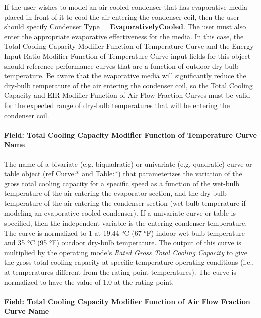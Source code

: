If the user wishes to model an air-cooled condenser that has evaporative media placed in front of it to cool the air entering the condenser coil, then the user should specify Condenser Type = \textbf{EvaporativelyCooled}. The user must also enter the appropriate evaporative effectiveness for the media. In this case, the Total Cooling Capacity Modifier Function of Temperature Curve and the Energy Input Ratio Modifier Function of Temperature Curve input fields for this object should reference performance curves that are a function of outdoor dry-bulb temperature. Be aware that the evaporative media will significantly reduce the dry-bulb temperature of the air entering the condenser coil, so the Total Cooling Capacity and EIR Modifier Function of Air Flow Fraction Curves must be valid for the expected range of dry-bulb temperatures that will be entering the condenser coil.

\paragraph{Field: Total Cooling Capacity Modifier Function of Temperature Curve Name}

The name of a bivariate (e.g. biquadratic) or univariate (e.g. quadratic) curve or table object (ref Curve:* and Table:*) that parameterizes the variation of the gross total cooling capacity for a specific speed as a function of the wet-bulb temperature of the air entering the evaporator section, and the dry-bulb temperature of the air entering the condenser section (wet-bulb temperature if modeling an evaporative-cooled condenser). If a univariate curve or table is specified, then the independent variable is the entering condenser temperature. The curve is normalized to 1 at 19.44 °C (67 °F) indoor wet-bulb temperature and 35 °C (95 °F) outdoor dry-bulb temperature. The output of this curve is multiplied by the operating mode's \textit{Rated Gross Total Cooling Capacity} to give the gross total cooling capacity at specific temperature operating conditions (i.e., at temperatures different from the rating point temperatures). The curve is normalized to have the value of 1.0 at the rating point.

\paragraph{Field: Total Cooling Capacity Modifier Function of Air Flow Fraction Curve Name}\label{field-total-cooling-capacity-function-of-air-flow-fraction-curve-name}

